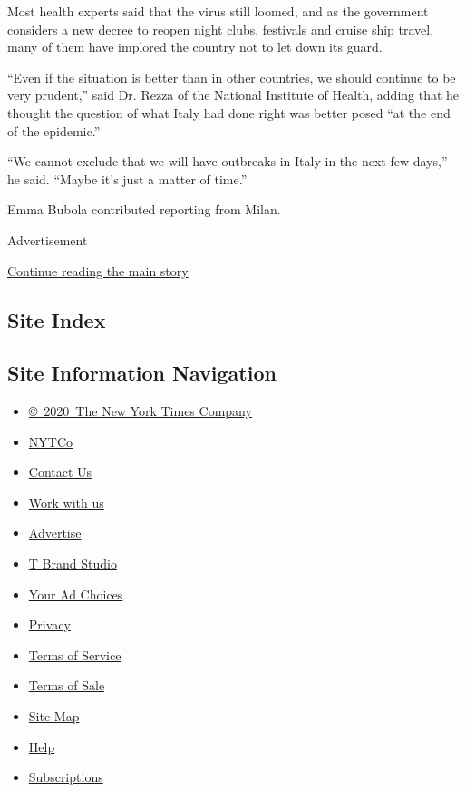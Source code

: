 Most health experts said that the virus still loomed, and as the
government considers a new decree to reopen night clubs, festivals and
cruise ship travel, many of them have implored the country not to let
down its guard.

``Even if the situation is better than in other countries, we should
continue to be very prudent,'' said Dr. Rezza of the National Institute
of Health, adding that he thought the question of what Italy had done
right was better posed ``at the end of the epidemic.''

``We cannot exclude that we will have outbreaks in Italy in the next few
days,'' he said. ``Maybe it's just a matter of time.''

Emma Bubola contributed reporting from Milan.

Advertisement

\protect\hyperlink{after-bottom}{Continue reading the main story}

\hypertarget{site-index}{%
\subsection{Site Index}\label{site-index}}

\hypertarget{site-information-navigation}{%
\subsection{Site Information
Navigation}\label{site-information-navigation}}

\begin{itemize}
\tightlist
\item
  \href{https://help.nytimes.com/hc/en-us/articles/115014792127-Copyright-notice}{©~2020~The
  New York Times Company}
\end{itemize}

\begin{itemize}
\tightlist
\item
  \href{https://www.nytco.com/}{NYTCo}
\item
  \href{https://help.nytimes.com/hc/en-us/articles/115015385887-Contact-Us}{Contact
  Us}
\item
  \href{https://www.nytco.com/careers/}{Work with us}
\item
  \href{https://nytmediakit.com/}{Advertise}
\item
  \href{http://www.tbrandstudio.com/}{T Brand Studio}
\item
  \href{https://www.nytimes.com/privacy/cookie-policy\#how-do-i-manage-trackers}{Your
  Ad Choices}
\item
  \href{https://www.nytimes.com/privacy}{Privacy}
\item
  \href{https://help.nytimes.com/hc/en-us/articles/115014893428-Terms-of-service}{Terms
  of Service}
\item
  \href{https://help.nytimes.com/hc/en-us/articles/115014893968-Terms-of-sale}{Terms
  of Sale}
\item
  \href{https://spiderbites.nytimes.com}{Site Map}
\item
  \href{https://help.nytimes.com/hc/en-us}{Help}
\item
  \href{https://www.nytimes.com/subscription?campaignId=37WXW}{Subscriptions}
\end{itemize}
